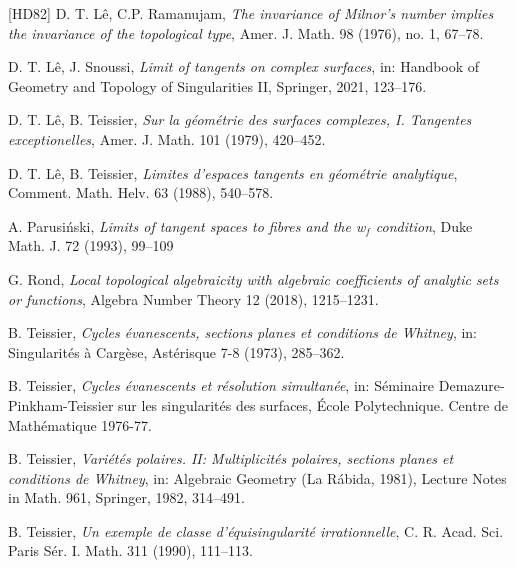 \documentclass[12pt]{amsart}
\theoremstyle{definition}
\numberwithin{equation}{section}
\begin{document}
\begin{thebibliography}{[HD82]}
 D. T. L{\^e}, C.P. Ramanujam,  \emph{The invariance of Milnor’s number implies the invariance
of the topological type}, Amer. J. Math. 98 (1976), no. 1, 67--78.

 D. T. L{\^e}, J.  Snoussi,     
\emph{Limit of tangents on complex surfaces}, in: Handbook of Geometry and Topology of Singularities II,  Springer, 2021, 123--176.

 D. T. L{\^e}, B. Teissier,  \emph{Sur la g{\'e}om\'etrie des surfaces complexes, I.  Tangentes exceptionelles}, Amer. J.  Math. {101} (1979), 420--452. 

 D. T. L{\^e}, B. Teissier, \emph{Limites d'espaces tangents en géométrie analytique}, Comment. Math. Helv. 63 (1988), 540--578.

 A.  Parusi\'nski,  
\emph{Limits of tangent spaces to fibres and the w$_f$ condition},   
    Duke Math. J.  72  (1993),  99--109  

  G. Rond, \emph{Local topological algebraicity with algebraic coefficients of analytic sets or functions},
Algebra Number Theory 12 (2018), 1215--1231.

  B. Teissier, \emph{Cycles évanescents, sections planes et conditions de Whitney},  in: Singularités à Cargèse, Astérisque {7-8} (1973), 285--362.

   B. Teissier, \emph{Cycles évanescents et résolution simultanée}, in: Séminaire Demazure-Pinkham-Teissier sur les singularités des surfaces, École Polytechnique. Centre de Mathématique 1976-77.

  B. Teissier, \emph{Variétés polaires. II: Multiplicités polaires, sections planes et conditions de Whitney}, in: Algebraic Geometry (La Rábida, 1981), Lecture Notes in Math. 961, Springer,  
 1982, 314--491.

 B. Teissier, \emph{Un exemple de classe d'\'{e}quisingularit\'{e} irrationnelle}, C.  R. Acad. Sci. Paris S\'{e}r. I. Math. {311} (1990), 111--113.







\end{thebibliography}
\end{document}
